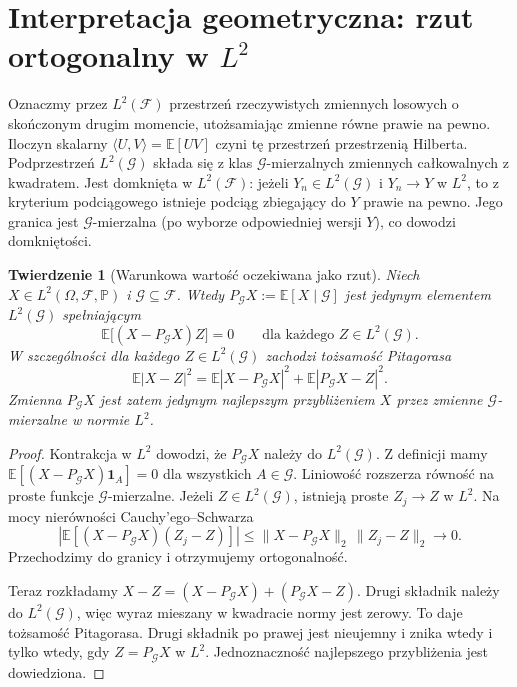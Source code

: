 \documentclass[11pt,a4paper,oneside]{report}
\numberwithin{equation}{chapter}
\theoremstyle{plain}
\newtheorem{twierdzenie}{Twierdzenie}[chapter]
\theoremstyle{definition}
\theoremstyle{remark}
\newcommand{\Prob}{\mathbb{P}}
\newcommand{\E}{\mathbb{E}}
\newcommand{\ind}[1]{\mathbf{1}_{#1}}
\begin{document}
\section{Interpretacja geometryczna: rzut ortogonalny w \texorpdfstring{$L^2$}{L2}}

Oznaczmy przez $L^2(\mathcal F)$ przestrzeń
rzeczywistych zmiennych losowych o skończonym drugim
momencie, utożsamiając zmienne równe prawie na pewno.
Iloczyn skalarny $\langle U,V\rangle=\E[UV]$
czyni tę przestrzeń przestrzenią Hilberta.
Podprzestrzeń $L^2(\mathcal G)$ składa się z klas
$\mathcal G$-mierzalnych zmiennych całkowalnych z
kwadratem. Jest domknięta w $L^2(\mathcal F)$:
jeżeli $Y_n\in L^2(\mathcal G)$ i $Y_n\to Y$
w $L^2$, to z kryterium podciągowego istnieje
podciąg zbiegający do $Y$ prawie na pewno.
Jego granica jest $\mathcal G$-mierzalna (po wyborze
odpowiedniej wersji $Y$), co dowodzi domkniętości.

\begin{twierdzenie}[Warunkowa wartość oczekiwana jako rzut]
Niech $X\in L^2(\Omega,\mathcal F,\Prob)$ i
$\mathcal G\subseteq\mathcal F$. Wtedy
$P_{\mathcal G}X:=\E[X\mid\mathcal G]$ jest
jedynym elementem $L^2(\mathcal G)$ spełniającym
\[
\E\big[(X-P_{\mathcal G}X)Z\big]=0
\qquad\text{dla każdego } Z\in L^2(\mathcal G).
\]
W szczególności dla każdego $Z\in L^2(\mathcal G)$
zachodzi tożsamość Pitagorasa
\[
\E|X-Z|^2
=\E|X-P_{\mathcal G}X|^2
+\E|P_{\mathcal G}X-Z|^2.
\]
Zmienna $P_{\mathcal G}X$ jest zatem jedynym
najlepszym przybliżeniem $X$ przez zmienne
$\mathcal G$-mierzalne w normie $L^2$.
\end{twierdzenie}
\begin{proof}
Kontrakcja w $L^2$ dowodzi, że $P_{\mathcal G}X$
należy do $L^2(\mathcal G)$. Z definicji mamy
$\E[(X-P_{\mathcal G}X)\ind A]=0$
dla wszystkich $A\in\mathcal G$.
Liniowość rozszerza równość na proste funkcje
$\mathcal G$-mierzalne. Jeżeli $Z\in L^2(\mathcal G)$,
istnieją proste $Z_j\to Z$ w $L^2$. Na mocy
nierówności Cauchy'ego--Schwarza
\[
\left|\E[(X-P_{\mathcal G}X)(Z_j-Z)]\right|
\leq\|X-P_{\mathcal G}X\|_2\,\|Z_j-Z\|_2\to0.
\]
Przechodzimy do granicy i otrzymujemy ortogonalność.

Teraz rozkładamy
$X-Z=(X-P_{\mathcal G}X)+(P_{\mathcal G}X-Z)$.
Drugi składnik należy do $L^2(\mathcal G)$,
więc wyraz mieszany w kwadracie normy jest zerowy.
To daje tożsamość Pitagorasa. Drugi składnik
po prawej jest nieujemny i znika wtedy i tylko
wtedy, gdy $Z=P_{\mathcal G}X$ w $L^2$.
Jednoznaczność najlepszego przybliżenia jest dowiedziona.
\end{proof}
\end{document}
